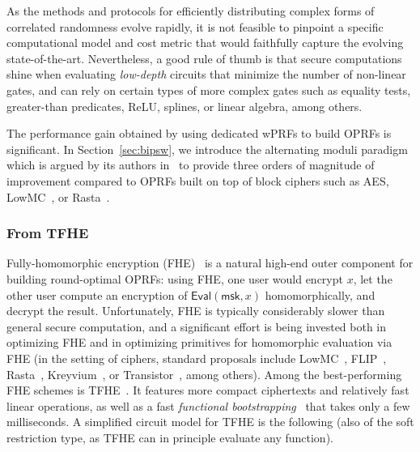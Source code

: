 \documentclass[journal=tosc,submission]{iacrtrans}
\theoremstyle{theorem}
\newcommand\msk{\ensuremath{\mathsf{msk}}\xspace}
\newcommand\Eval{\ensuremath{\mathsf{Eval}}\xspace}
\newcommand\aes{\textsf{AES}}
\begin{document}
As the methods and protocols for efficiently distributing complex forms of correlated randomness evolve rapidly, it is not feasible to pinpoint a specific computational model and cost metric that would faithfully capture the evolving state-of-the-art. Nevertheless, a good rule of thumb is that secure computations shine when evaluating \emph{low-depth} circuits that minimize the number of non-linear gates, and can rely on certain types of more complex gates such as equality tests, greater-than predicates, ReLU, splines, or linear algebra, among others.

The performance gain obtained by using dedicated wPRFs to build OPRFs is significant. In Section~\ref{sec:bipsw}, we introduce the alternating moduli paradigm which is argued by its authors in~\cite[Table~2]{TCC:BIPSW18} to provide three orders of magnitude of improvement compared to OPRFs built on top of block ciphers such as \aes{}, {\sf LowMC}~\cite{EC:ARSTZ15}, or {\sf Rasta}~\cite{C:DEGLLL18}.

\subsubsection{From TFHE}

Fully-homomorphic encryption (FHE)~\cite{STOC:Gentry09} is a natural high-end outer component for building round-optimal OPRFs: using FHE, one user would encrypt $x$, let the other user compute an encryption of $\Eval(\msk,x)$ homomorphically, and decrypt the result. Unfortunately, FHE is typically considerably slower than general secure computation, and a significant effort is being invested both in optimizing FHE and in optimizing primitives for homomorphic evaluation via FHE (in the setting of ciphers, standard proposals include {\sf LowMC}~\cite{EC:ARSTZ15}, {\sf FLIP}~\cite{EC:MJSC16}, {\sf Rasta}~\cite{C:DEGLLL18}, {\sf Kreyvium}~\cite{FSE:CCFLNP16}, or {\sf Transistor}~\cite{add:Transistor}, among others). Among the best-performing FHE schemes is {\sf TFHE}~\cite{JC:CGGI20}. It features more compact ciphertexts and relatively fast linear operations, as well as a fast \emph{functional bootstrapping}~\cite{EPRINT:MicPol20,EPRINT:Joye21b} that takes only a few milliseconds.
A simplified circuit model for {\sf TFHE} is the following (also of the soft restriction type, as {\sf TFHE} can in principle evaluate any function).
\end{document}
